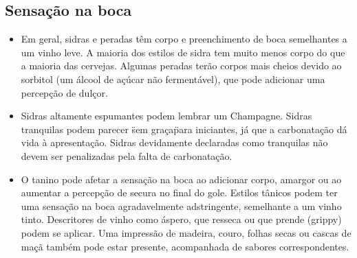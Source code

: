 \subsection*{Sensação na boca}
\begin{itemize}
\item Em geral, sidras e peradas têm corpo e preenchimento de boca semelhantes a um vinho leve. A maioria dos estilos de sidra tem muito menos corpo do que a maioria das cervejas. Algumas peradas terão corpos mais cheios devido ao sorbitol (um álcool de açúcar não fermentável), que pode adicionar uma percepção de dulçor.
\item Sidras altamente espumantes podem lembrar um Champagne. Sidras tranquilas podem parecer \"sem graça\" para iniciantes, já que a carbonatação dá vida à apresentação. Sidras devidamente declaradas como tranquilas não devem ser penalizadas pela falta de carbonatação.
\item O tanino pode afetar a sensação na boca ao adicionar corpo, amargor ou ao aumentar a percepção de secura no final do gole. Estilos tânicos podem ter uma sensação na boca agradavelmente adstringente, semelhante a um vinho tinto. Descritores de vinho como áspero, que resseca ou que prende (grippy) podem se aplicar. Uma impressão de madeira, couro, folhas secas ou cascas de maçã também pode estar presente, acompanhada de sabores correspondentes.
\end{itemize}
